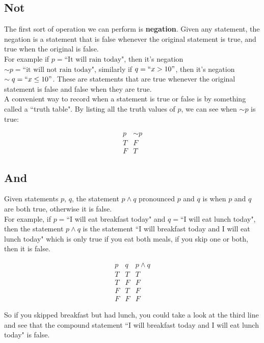 \documentclass[10pt]{article}
\theoremstyle{definition}
\begin{document}
\subsection{Not}

The first sort of operation we can perform is {\bf negation}.  Given any statement, the negation is a statement that is false whenever the original statement is true, and true when the original is false.\\

For example if $p=\text{``It will rain today"}$,  then it's negation $\sim p=\text{``it will not rain today"}$, similarly if $q=``x>10"$, then it's negation $\sim q =``x\leq 10"$.  These are statements that are true whenever the original statement is false and false when they are true.\\

A convenient way to record when a statement is true or false is by something called a ``truth table".  By listing all the truth values of $p$, we can see when $\sim p$ is true:

$$\begin{array}{c|c}
p&\sim p\\
\hline
T & F\\
F&T
\end{array}$$


\subsection{And}

Given statements $p$, $q$, the statement $p\wedge q$ pronounced $p$ and $q$ is when $p$ and $q$ are both true, otherwise it is false.\\

For example, if $p=$``I will eat breakfast today" and $q=$``I will eat lunch today", then the statement $p\wedge q$ is the statement ``I will breakfast today and I will eat lunch today" which is only true if you eat both meals, if you skip one or both, then it is false.

$$\begin{array}{c|c|c}
p&q&p\wedge q\\
\hline
T & T&T\\
T&F&F\\
F&T&F\\
F&F&F
\end{array}$$

So if you skipped breakfast but had lunch, you could take a look at the third line and see that the compound statement ``I will breakfast today and I will eat lunch today" is false.
\end{document}
